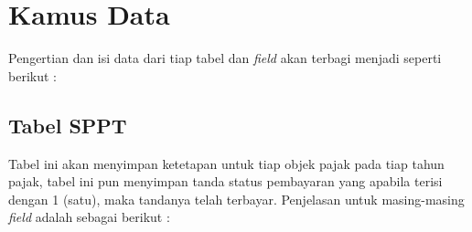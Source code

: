 \section{Kamus Data}

Pengertian dan isi data dari tiap tabel dan \textit{field} akan terbagi menjadi seperti berikut :

\subsection{Tabel SPPT}

Tabel ini akan menyimpan ketetapan untuk tiap objek pajak pada tiap tahun pajak, tabel ini pun menyimpan tanda status pembayaran yang apabila terisi dengan 1 (satu), maka tandanya telah terbayar. Penjelasan untuk masing-masing \textit{field} adalah sebagai berikut :

